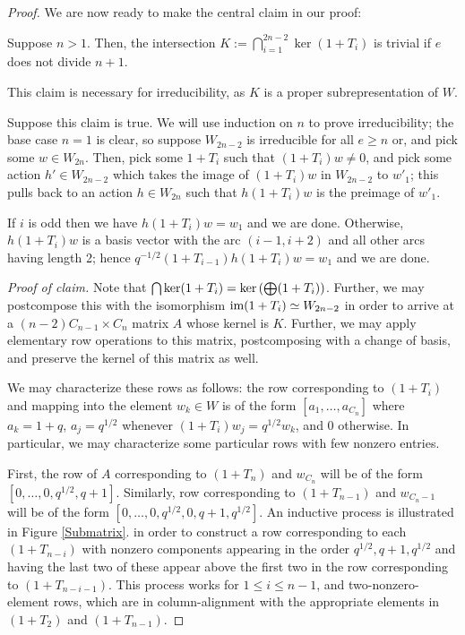 \documentclass{amsart}
\begin{document}
\begin{proof}
  We are now ready to make the central claim in our proof:
  \begin{claim*}
    Suppose $n > 1$.
    Then, the intersection $K := \bigcap_{i = 1}^{2n - 2} \ker (1 + T_i)$ is trivial if $e$ does not divide $n + 1$.
  \end{claim*}
  This claim is necessary for irreducibility, as $K$ is a proper subrepresentation of $W$.
  
  Suppose this claim is true.
  We will use induction on $n$ to prove irreducibility;
  the base case $n = 1$ is clear, so suppose $W_{2n - 2}$ is irreducible for all $e \geq n$ or, and pick some $w \in W_{2n}$.
  Then, pick some $1 + T_i$ such that $(1 + T_i)w \neq 0$, and pick some action $h' \in W_{2n - 2}$ which takes the image of $(1 + T_i)w$ in $W_{2n - 2}$ to $w'_1$;
  this pulls back to an action $h \in W_{2n}$ such that $h(1 + T_i)w$ is the preimage of $w'_1$.
  
  If $i$ is odd then we have $h(1 + T_i)w = w_1$ and we are done. 
  Otherwise, $h(1 + T_i)w$ is a basis vector with the arc $(i-1,i+2)$ and all other arcs having length 2;
  hence $q^{-1/2}(1 + T_{i-1})h(1 + T_i)w = w_1$ and we are done.

 \textit{Proof of claim.}
 Note that $\bigcap \text{ker}(1 + T_i)=\text{ker}\left( \bigoplus (1 + T_i) \right)$.
 Further, we may postcompose this with the isomorphism $\text{im}(1 + T_i) \simeq W_{2n - 2}$ in order to arrive at a $(n - 2)C_{n-1} \times C_n$ matrix $A$ whose kernel is $K$.
 Further, we may apply elementary row operations to this matrix, postcomposing with a change of basis, and preserve the kernel of this matrix as well.

 We may characterize these rows as follows:
 the row corresponding to $(1 + T_i)$ and mapping into the element $w_k \in W$ is of the form $[a_1,\dots,a_{C_n}]$ where $a_k = 1 + q$, $a_j = q^{1/2}$ whenever $(1 + T_i)w_j = q^{1/2}w_k$, and 0 otherwise.
 In particular, we may characterize some particular rows with few nonzero entries.

 First, the row of $A$ corresponding to $(1 + T_n)$ and $w_{C_n}$ will be of the form $[0,\dots,0,q^{1/2},q + 1]$.
 Similarly, row corresponding to $(1 + T_{n - 1})$ and $w_{C_n - 1}$ will be of the form $[0,\dots,0,q^{1/2},0,q+1,q^{1/2}]$.
 An inductive process is illustrated in Figure \ref{Submatrix}. in order to construct a row corresponding to each $(1 + T_{n - i})$ with nonzero components appearing in the order $q^{1/2}, q + 1, q^{1/2}$ and having the last two of these appear above the first two in the row corresponding to $(1 + T_{n - i - 1})$.
 This process works for $1 \leq i \leq n - 1$, and two-nonzero-element rows, which are in column-alignment with the appropriate elements in $(1 + T_{2})$ and $(1 + T_{n - 1})$.


\end{proof}
\end{document}
